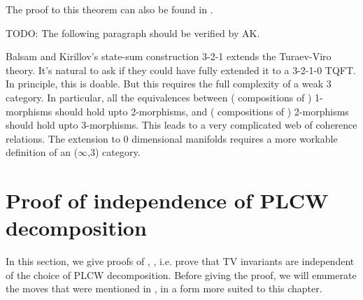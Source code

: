 The proof to this theorem can also be found in .

TODO: The following paragraph should be verified by AK.


 Balsam and Kirillov's state-sum construction  3-2-1 extends the Turaev-Viro 
 theory.  It's natural to ask if they could have fully extended it to a 3-2-1-0 TQFT.  
 In principle, this is doable. But this requires the full complexity of a weak 3 category.
In particular, all the equivalences between ( compositions of ) 1-morphisms 
should hold upto 2-morphisms, and ( compositions of ) 2-morphisms should hold 
 upto 3-morphisms. This leads to a very complicated web of coherence relations. 
 The extension to 0 dimensional manifolds requires a more workable definition of 
 an ($\infty$,3) category.


\section{Proof of independence of PLCW decomposition}\label{s:proof}

In this section, we give proofs of , ,
i.e. prove that TV invariants are independent of the choice of PLCW
decomposition. Before giving the proof, we will enumerate the 
moves that were mentioned in , in a form more suited 
to this chapter.

